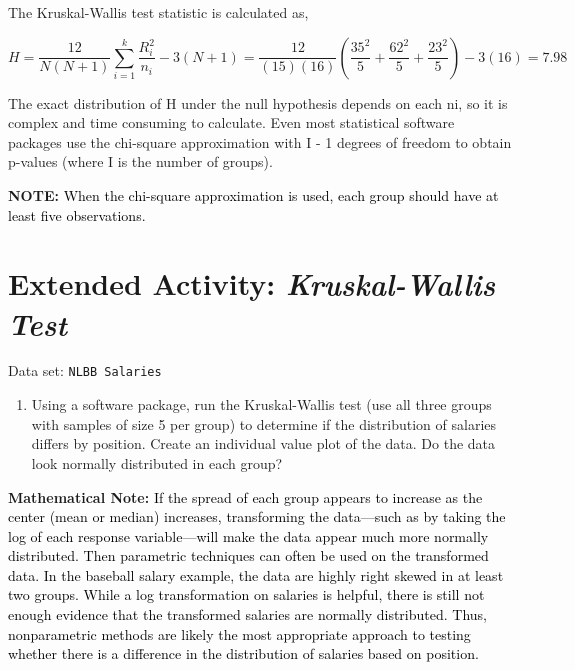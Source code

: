 \documentclass[
]{report}
\providecommand{\tightlist}{%
  \setlength{\itemsep}{0pt}\setlength{\parskip}{0pt}}
\theoremstyle{definition}
\theoremstyle{definition}
\theoremstyle{definition}
\theoremstyle{definition}
\theoremstyle{remark}
\begin{document}
The Kruskal-Wallis test statistic is calculated as,

\begin{equation} 
  H = \frac{12}{N(N + 1)} \sum_{i=1}^k \frac{R_i^2}{n_i} - 3(N + 1) = \frac{12}{(15)(16)}(\frac{35^2}{5}+\frac{62^2}{5}+\frac{23^2}{5}) -3(16) =7.98
  \tag{1.5} \label{eq:1_5}
\end{equation}

The exact distribution of H under the null hypothesis depends on each ni, so it is complex and time consuming to calculate. Even most statistical software packages use the chi-square approximation with I - 1 degrees of freedom to obtain p-values (where I is the number of groups).

\large

\textbf{NOTE:}
\textcolor{black}{When the chi-square approximation is used, each group should have at least five observations.
}

\normalsize

\hypertarget{extended-activity-kruskal-wallis-test}{%
\section*{\texorpdfstring{Extended Activity: \emph{Kruskal-Wallis Test}}{Extended Activity: Kruskal-Wallis Test}}\label{extended-activity-kruskal-wallis-test}}

Data set: \texttt{NLBB\ Salaries}

\begin{enumerate}
\def\labelenumi{\arabic{enumi}.}
\setcounter{enumi}{27}
\tightlist
\item
  Using a software package, run the Kruskal-Wallis test (use all three groups with samples of size 5 per group) to determine if the distribution of salaries differs by position. Create an individual value plot of the data. Do the data look normally distributed in each group?
\end{enumerate}

\large

\textbf{Mathematical Note:}
\textcolor{black}{If the spread of each group appears to increase as the center (mean or median) increases, transforming the data—such as by taking the log of each response variable—will make the data appear much more normally distributed. Then parametric techniques can often be used on the transformed data. In the baseball salary
example, the data are highly right skewed in at least two groups. While a log transformation on salaries is helpful, there is still not enough evidence that the transformed salaries are normally distributed. Thus, nonparametric methods are likely the most appropriate approach to testing whether there is a difference in the distribution of salaries based on position.
}
\end{document}
